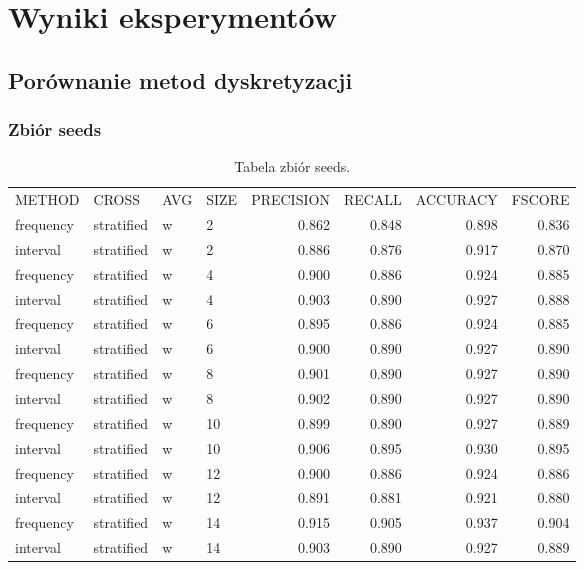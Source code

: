 \chapter{Wyniki eksperymentów}

\section{Porównanie metod dyskretyzacji}
\subsection{Zbiór seeds}
\begin{table}[H]
\centering
\caption{Tabela zbiór seeds.}
\label{table-seeds}
\begin{tabular}{llllrrrr}
METHOD    & CROSS      & AVG & SIZE & PRECISION & RECALL & ACCURACY & FSCORE \\
frequency & stratified & w   & 2    & 0.862     & 0.848  & 0.898    & 0.836  \\
interval  & stratified & w   & 2    & 0.886     & 0.876  & 0.917    & 0.870  \\
frequency & stratified & w   & 4    & 0.900     & 0.886  & 0.924    & 0.885  \\
interval  & stratified & w   & 4    & 0.903     & 0.890  & 0.927    & 0.888  \\
frequency & stratified & w   & 6    & 0.895     & 0.886  & 0.924    & 0.885  \\
interval  & stratified & w   & 6    & 0.900     & 0.890  & 0.927    & 0.890  \\
frequency & stratified & w   & 8    & 0.901     & 0.890  & 0.927    & 0.890  \\
interval  & stratified & w   & 8    & 0.902     & 0.890  & 0.927    & 0.890  \\
frequency & stratified & w   & 10   & 0.899     & 0.890  & 0.927    & 0.889  \\
interval  & stratified & w   & 10   & 0.906     & 0.895  & 0.930    & 0.895  \\
frequency & stratified & w   & 12   & 0.900     & 0.886  & 0.924    & 0.886  \\
interval  & stratified & w   & 12   & 0.891     & 0.881  & 0.921    & 0.880  \\
frequency & stratified & w   & 14   & 0.915     & 0.905  & 0.937    & 0.904  \\
interval  & stratified & w   & 14   & 0.903     & 0.890  & 0.927    & 0.889  \\

\end{tabular}
\end{table}
